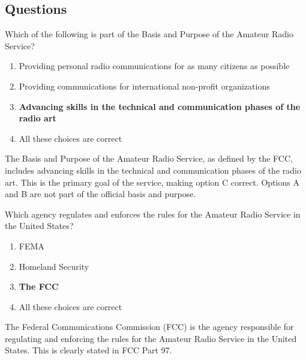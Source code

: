 \subsection*{Questions}

\begin{tcolorbox}[colback=gray!10!white,colframe=black!75!black,title={T1A01}]
    Which of the following is part of the Basis and Purpose of the Amateur Radio Service?
    \begin{enumerate}[label=\Alph*,noitemsep]
        \item Providing personal radio communications for as many citizens as possible
        \item Providing communications for international non-profit organizations
        \item \textbf{Advancing skills in the technical and communication phases of the radio art}
        \item All these choices are correct
    \end{enumerate}
\end{tcolorbox}
The Basis and Purpose of the Amateur Radio Service, as defined by the FCC, includes advancing skills in the technical and communication phases of the radio art. This is the primary goal of the service, making option C correct. Options A and B are not part of the official basis and purpose.


\begin{tcolorbox}[colback=gray!10!white,colframe=black!75!black,title={T1A02}]
    Which agency regulates and enforces the rules for the Amateur Radio Service in the United States?
    \begin{enumerate}[label=\Alph*,noitemsep]
        \item FEMA
        \item Homeland Security
        \item \textbf{The FCC}
        \item All these choices are correct
    \end{enumerate}
\end{tcolorbox}
The Federal Communications Commission (FCC) is the agency responsible for regulating and enforcing the rules for the Amateur Radio Service in the United States. This is clearly stated in FCC Part 97.


